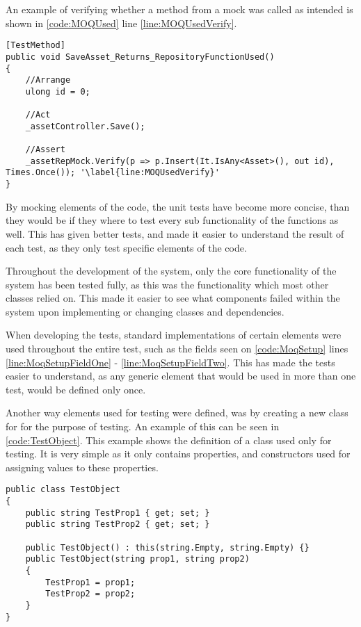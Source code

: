 An example of verifying whether a method from a mock was called as intended is shown in \autoref{code:MOQUsed} line \ref{line:MOQUsedVerify}.

\begin{listing}[H]
\begin{verbatim}
[TestMethod]
public void SaveAsset_Returns_RepositoryFunctionUsed()
{
    //Arrange
    ulong id = 0;
    
    //Act
    _assetController.Save();

    //Assert
    _assetRepMock.Verify(p => p.Insert(It.IsAny<Asset>(), out id), Times.Once()); '\label{line:MOQUsedVerify}'
}
\end{verbatim}
\label{code:MOQUsed}
\end{listing}

By mocking elements of the code, the unit tests have become more concise, than they would be if they where to test every sub functionality of the functions as well. This has given better tests, and made it easier to understand the result of each test, as they only test specific elements of the code.
\par
Throughout the development of the system, only the core functionality of the system has been tested fully, as this was the functionality which most other classes relied on. This made it easier to see what components failed within the system upon implementing or changing classes and dependencies. 
\par
When developing the tests, standard implementations of certain elements were used throughout the entire test, such as the fields seen on \autoref{code:MoqSetup} lines \ref{line:MoqSetupFieldOne} - \ref{line:MoqSetupFieldTwo}. This has made the tests easier to understand, as any generic element that would be used in more than one test, would be defined only once. 
\par
Another way elements used for testing were defined, was by creating a new class for for the purpose of testing. An example of this can be seen in \autoref{code:TestObject}. This example shows the definition of a class used only for testing. It is very simple as it only contains properties, and constructors used for assigning values to these properties. 

\begin{listing}[H]
\begin{verbatim}
public class TestObject
{
    public string TestProp1 { get; set; }
    public string TestProp2 { get; set; }
            
    public TestObject() : this(string.Empty, string.Empty) {}
    public TestObject(string prop1, string prop2)
    {
        TestProp1 = prop1;
        TestProp2 = prop2;
    }
}
\end{verbatim}
\label{code:TestObject}
\end{listing}

